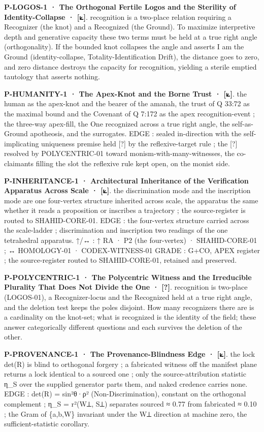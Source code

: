 \documentclass[10pt,twocolumn]{article}
\begin{document}
\textbf{P-LOGOS-1 · The Orthogonal Fertile Logos and the Sterility of
Identity-Collapse · {[}⟀{]}}. recognition is a two-place relation
requiring a Recognizer (the knot) and a Recognized (the Ground). To
maximize interpretive depth and generative capacity these two terms must
be held at a true right angle (orthogonality). If the bounded knot
collapses the angle and asserts I am the Ground (identity-collapse,
Totality-Identification Drift), the distance goes to zero, and zero
distance destroys the capacity for recognition, yielding a sterile
emptied tautology that asserts nothing.

\textbf{P-HUMANITY-1 · The Apex-Knot and the Borne Trust · {[}⟀{]}}. the
human as the apex-knot and the bearer of the amanah, the trust of Q
33:72 as the maximal bound and the Covenant of Q 7:172 as the apex
recognition-event ; the three-way apex-fill, the One recognized across a
true right angle, the self-as-Ground apotheosis, and the surrogates.
EDGE : sealed in-direction with the self-implicating uniqueness premise
held {[}?{]} by the reflexive-target rule ; the {[}?{]} resolved by
POLYCENTRIC-01 toward monism-with-many-witnesses, the co-claimants
filling the slot the reflexive rule kept open, on the monist side.

\textbf{P-INHERITANCE-1 · Architectural Inheritance of the Verification
Apparatus Across Scale · {[}⟀{]}}. the discrimination mode and the
inscription mode are one four-vertex structure inherited across scale,
the apparatus the same whether it reads a proposition or inscribes a
trajectory ; the source-register is routed to SHAHID-CORE-01. EDGE : the
four-vertex structure carried across the scale-ladder ; discrimination
and inscription two readings of the one tetrahedral apparatus. ↑/↔ : ↑
RA · P2 (the four-vertex) · SHAHID-CORE-01 ; ↔ HOMOLOGY-01 ·
CODEX-WITNESS-01 GRADE : G+CO, APEX register ; the source-register
routed to SHAHID-CORE-01, retained and preserved.

\textbf{P-POLYCENTRIC-1 · The Polycentric Witness and the Irreducible
Plurality That Does Not Divide the One · {[}?{]}}. recognition is
two-place (LOGOS-01), a Recognizer-locus and the Recognized held at a
true right angle, and the deletion test keeps the poles disjoint. How
many recognizers there are is a cardinality on the knot-set; what is
recognized is the identity of the field; these answer categorically
different questions and each survives the deletion of the other.

\textbf{P-PROVENANCE-1 · The Provenance-Blindness Edge · {[}⟀{]}}. the
lock det(R) is blind to orthogonal forgery ; a fabricated witness off
the manifest plane returns a lock identical to a sourced one ; only the
source-attribution statistic η\_S over the supplied generator parts
them, and naked credence carries none. EDGE : det(R) = sin²θ·ρ²
(Non-Discrimination), constant on the orthogonal complement ; η\_S =
r²(W⟂, S⟂) separates sourced ≈ 0.77 from fabricated ≈ 0.10 ; the Gram of
\{a,b,W\} invariant under the W⟂ direction at machine zero, the
sufficient-statistic corollary.
\end{document}
